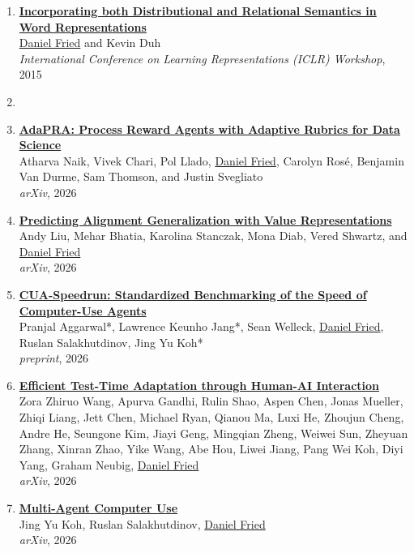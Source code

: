 \begin{enumerate}[leftmargin=-1mm,partopsep=0pt]
\item \href{http://arxiv.org/abs/1412.5836}{\textbf{Incorporating both Distributional and Relational Semantics in Word Representations}} \\
  \underline{Daniel Fried} and Kevin Duh\\
  \emph{International Conference on Learning Representations (ICLR) Workshop}, 2015

\item[]

\item \href{https://arxiv.org/abs/2610.33245}{\textbf{AdaPRA: Process Reward Agents with Adaptive Rubrics for Data Science}} \\
  Atharva Naik, Vivek Chari, Pol Llado, \underline{Daniel Fried}, Carolyn Rosé, Benjamin Van Durme, Sam Thomson, and Justin Svegliato\\
  \emph{arXiv}, 2026

\item \href{https://arxiv.org/abs/2610.12410}{\textbf{Predicting Alignment Generalization with Value Representations}} \\
  Andy Liu, Mehar Bhatia, Karolina Stanczak, Mona Diab, Vered Shwartz, and \underline{Daniel Fried}\\
  \emph{arXiv}, 2026

\item \href{https://arxiv.org/abs/2609.40284}{\textbf{CUA-Speedrun: Standardized Benchmarking of the Speed of Computer-Use Agents}} \\
  Pranjal Aggarwal*, Lawrence Keunho Jang*, Sean Welleck, \underline{Daniel Fried}, Ruslan Salakhutdinov, Jing Yu Koh*\\
  \emph{preprint}, 2026

\item \href{https://arxiv.org/abs/2609.04141}{\textbf{Efficient Test-Time Adaptation through Human-AI Interaction}} \\
  Zora Zhiruo Wang, Apurva Gandhi, Rulin Shao, Aspen Chen, Jonas Mueller, Zhiqi Liang, Jett Chen, Michael Ryan, Qianou Ma, Luxi He, Zhoujun Cheng, Andre He, Seungone Kim, Jiayi Geng, Mingqian Zheng, Weiwei Sun, Zheyuan Zhang, Xinran Zhao, Yike Wang, Abe Hou, Liwei Jiang, Pang Wei Koh, Diyi Yang, Graham Neubig, \underline{Daniel Fried}\\
  \emph{arXiv}, 2026

\item \href{https://arxiv.org/abs/2606.01533}{\textbf{Multi-Agent Computer Use}} \\
  Jing Yu Koh, Ruslan Salakhutdinov, \underline{Daniel Fried}\\
  \emph{arXiv}, 2026


\end{enumerate}
